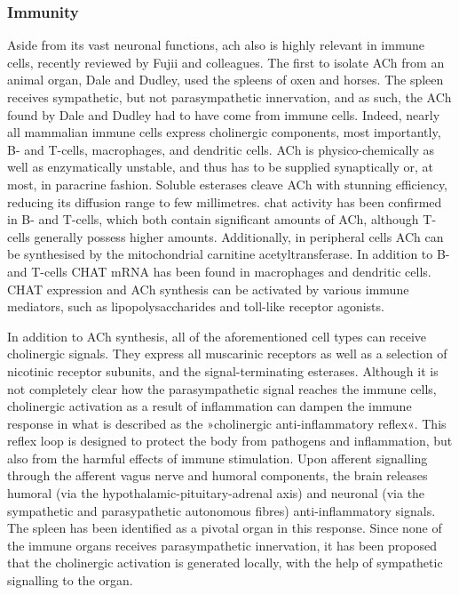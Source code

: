 \subsubsection{Immunity}
Aside from its vast neuronal functions, \ac{ach} also is highly relevant in immune cells, recently reviewed by Fujii and colleagues\cite{Fujii2017}. The first to isolate ACh from an animal organ, Dale and Dudley\cite{Dale1929}, used the spleens of oxen and horses. The spleen receives sympathetic, but not parasympathetic innervation, and as such, the ACh found by Dale and Dudley had to have come from immune cells. Indeed, nearly all mammalian immune cells express cholinergic components, most importantly, B- and T-cells, macrophages, and dendritic cells. ACh is physico-chemically as well as enzymatically unstable, and thus has to be supplied synaptically or, at most, in paracrine fashion. Soluble esterases cleave ACh with stunning efficiency, reducing its diffusion range to few millimetres. \Ac{chat} activity has been confirmed in B- and T-cells, which both contain significant amounts of ACh, although T-cells generally possess higher amounts. Additionally, in peripheral cells ACh can be synthesised by the mitochondrial carnitine acetyltransferase. In addition to B- and T-cells CHAT mRNA has been found in macrophages and dendritic cells. CHAT expression and ACh synthesis can be activated by various immune mediators, such as lipopolysaccharides and toll-like receptor agonists.

In addition to ACh synthesis, all of the aforementioned cell types can receive cholinergic signals. They express all muscarinic receptors as well as a selection of nicotinic receptor subunits, and the signal-terminating esterases. Although it is not completely clear how the parasympathetic signal reaches the immune cells, cholinergic activation as a result of inflammation can dampen the immune response in what is described as the »cholinergic anti-inflammatory reflex«\cite{Pavlov2017}. This reflex loop is designed to protect the body from pathogens and inflammation, but also from the harmful effects of immune stimulation. Upon afferent signalling through the afferent vagus nerve and humoral components, the brain releases humoral (via the hypothalamic-pituitary-adrenal axis) and neuronal (via the sympathetic and parasypathetic autonomous fibres) anti-inflammatory signals. The spleen has been identified as a pivotal organ in this response. Since none of the immune organs receives parasympathetic innervation, it has been proposed that the cholinergic activation is generated locally, with the help of sympathetic signalling to the organ.

